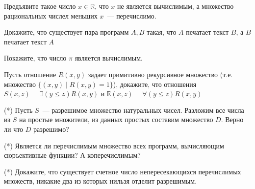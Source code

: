 \setcounter{curtask}{1}


\begin{task}
    Предъявите такое число $x \in \mathbb{R}$, что $x$ не является
    вычислимым, а множество рациональных числел меньших $x$~---
    перечислимо.
\end{task}

\begin{task}
    Докажите, что существует пара программ $A, B$ такая, что $A$
    печатает текст $B$, а $B$ печатает текст $A$
\end{task}

\begin{task}
    Покажите, что число $\pi$ является вычислимым.
\end{task}

\begin{task}
    Пусть отношение $R(x, y)$ задает примитивно рекурсивное множество
    (т.е. множество $\{(x, y) \mid R(x, y) = 1\}$), докажите, что
    отношения $S(x, z) = \exists (y \le z) R(x, y)$ и
    $Е(x, z) = \forall (y \le z) R(x, y)$
\end{task}


\breakline

\begin{task}(*)
    Пусть $S$~--- разрешимое множество натуральных чисел. Разложим все
    числа из $S$ на простые множители, из данных простых составим
    множество $D$. Верно ли что $D$ разрешимо?
\end{task}

\begin{task}(*)
    Является ли перечислимым множество всех программ, вычисляющим
    сюръективные функции? А коперечислимым?
\end{task}

\begin{task}(*)
    Докажите, что существует счетное число непересекающихся
    перечислимых множеств, никакие два из которых нильзя отделит
    разрешимым.
\end{task}